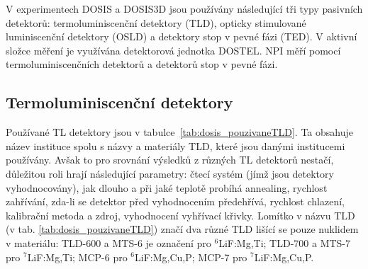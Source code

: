 
V experimentech DOSIS a DOSIS3D jsou používány následující tři typy pasivních detektorů: termoluminiscenční detektory (TLD), opticky stimulované luminiscenční detektory (OSLD) a detektory stop v pevné fázi (TED). V aktivní složce měření je využívána detektorová jednotka DOSTEL. NPI měří pomocí termoluminiscenčních detektorů a detektorů stop v pevné fázi. 
\subsection{Termoluminiscenční detektory}\label{sec:dosis_TLD}
Používané TL detektory jsou v tabulce~\ref{tab:dosis_pouzivaneTLD}. Ta obsahuje název instituce spolu s názvy a materiály TLD, které jsou danými institucemi používány. Avšak to pro srovnání výsledků z různých TL detektorů nestačí, důležitou roli hrají následující parametry: čtecí systém (jímž jsou detektory vyhodnocovány), jak dlouho a při jaké teplotě probíhá annealing, rychlost zahřívání, zda-li se detektor před vyhodnocením předehřívá, rychlost chlazení, kalibrační metoda a zdroj, vyhodnocení vyhřívací křivky. Lomítko v názvu TLD (v tab. \ref{tab:dosis_pouzivaneTLD}) značí dva různé TLD lišící se pouze nuklidem v materiálu: TLD-600 a MTS-6 je označení pro $^6$LiF:Mg,Ti; TLD-700 a MTS-7 pro $^7$LiF:Mg,Ti; MCP-6 pro $^6$LiF:Mg,Cu,P; MCP-7 pro $^7$LiF:Mg,Cu,P. %
